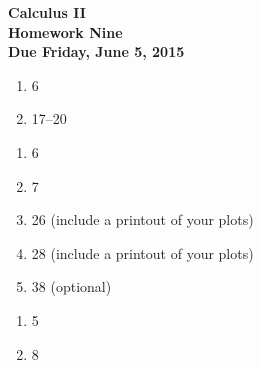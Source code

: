 \documentclass[12pt]{article}
\begin{document}
\pagestyle{empty}

\begin{center}
{\large {\bf Calculus II}}\\
\medskip
{\large {\bf Homework Nine}}\\
\medskip
{ {\bf Due Friday, June 5, 2015}}\\
\end{center}



\begin{enumerate}
\setlength{\itemsep}{-1mm}
  \item 6
  \item 17--20
\end{enumerate}



\begin{enumerate}
\setlength{\itemsep}{-1mm}
\item 6
\item 7
\item 26 (include a printout of your plots)
\item 28 (include a printout of your plots)
\item 38 (optional)
\end{enumerate}

\begin{enumerate}
\setlength{\itemsep}{-1mm}
  \item 5
  \item 8
\end{enumerate}
\end{document}
